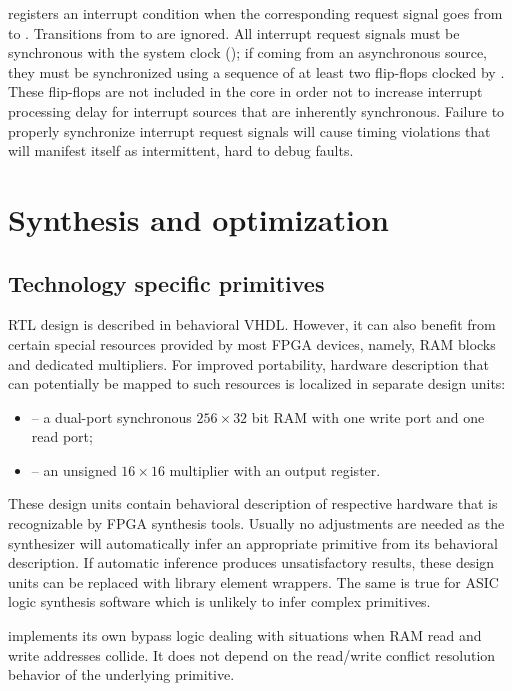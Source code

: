 \documentclass[a4paper,12pt,twoside,extrafontsizes]{memoir}
\begin{document}
\lxp{} registers an interrupt condition when the corresponding request signal goes from  to . Transitions from  to  are ignored. All interrupt request signals must be synchronous with the system clock (); if coming from an asynchronous source, they must be synchronized using a sequence of at least two flip-flops clocked by . These flip-flops are not included in the \lxp{} core in order not to increase interrupt processing delay for interrupt sources that are inherently synchronous. Failure to properly synchronize interrupt request signals will cause timing violations that will manifest itself as intermittent, hard to debug faults.

\section{Synthesis and optimization}
\label{sec:synthesis}

\subsection{Technology specific primitives}

\lxp{} RTL design is described in behavioral VHDL. However, it can also benefit from certain special resources provided by most FPGA devices, namely, RAM blocks and dedicated multipliers. For improved portability, hardware description that can potentially be mapped to such resources is localized in separate design units:

\begin{itemize}
	\item {} -- a dual-port synchronous $256 \times 32$ bit RAM with one write port and one read port;
	\item {} -- an unsigned $16 \times 16$ multiplier with an output register.
\end{itemize}

These design units contain behavioral description of respective hardware that is recognizable by FPGA synthesis tools. Usually no adjustments are needed as the synthesizer will automatically infer an appropriate primitive from its behavioral description. If automatic inference produces unsatisfactory results, these design units can be replaced with library element wrappers. The same is true for ASIC logic synthesis software which is unlikely to infer complex primitives.

\lxp{} implements its own bypass logic dealing with situations when RAM read and write addresses collide. It does not depend on the read/write conflict resolution behavior of the underlying primitive.
\end{document}
